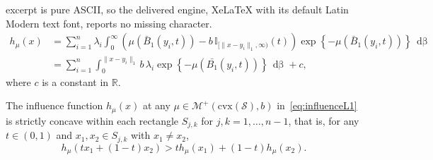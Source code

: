 \documentclass[10pt,a4paper]{amsart}
\newcommand{\death}{{\beta}}
\begin{document}
excerpt is pure ASCII, so the delivered engine, XeLaTeX with its default Latin Modern text font, reports no missing character.
\begin{align}\label{eq:influenceL1}
    h_{\mu}(x) &= \sum_{i=1}^n \lambda_i \int_0^\infty 
    \left( \mu\left(\bar{B}_1(y_i,t) \right) - b \, \mathbb{I}_{[\|x-y_i\|_1, \infty)}(t) \right) 
    \exp\left\{-\mu\left(\bar{B}_1(y_i,t) \right)\right\} \, \mathop{d\death(t)} \nonumber \\ &= \sum_{i=1}^n \int_0^{\|x-y_i \|_1}  b\,\lambda_i\exp\left\{-\mu\left(\bar{B_1}(y_i,t) \right) \right\} \, \mathop{d\death(t)} + c,
\end{align} where $c$ is a constant in $\mathbb{R}$.  

\begin{lemma}\label{lemma:piecewiseConcave}
    The influence function \(h_{\mu}(x)\) at any $\mu\in\mathcal{M}^+(\mathrm{cvx}(\mathcal{S}), b)$ in~\eqref{eq:influenceL1} is strictly concave within each rectangle \(S_{j,k}\) for \(j, k = 1, \dots, n-1\), that is, for any $t \in (0, 1)$ and \(x_1, x_2 \in S_{j,k}\) with $x_1 \ne x_2$,
    \begin{equation}
        h_{\mu}(t x_1 + (1-t)x_2) > t h_{\mu}(x_1) + (1-t)h_{\mu}(x_2).
    \end{equation}
\end{lemma}
\end{document}
